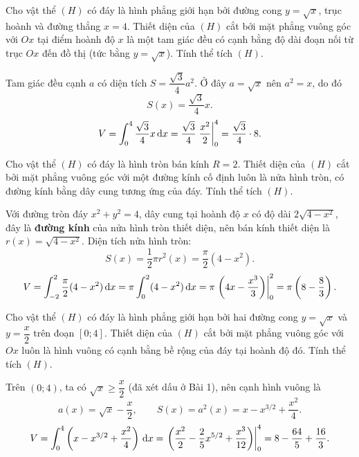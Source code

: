 \begin{hopvidu}
Cho vật thể $(H)$ có đáy là hình phẳng giới hạn bởi đường cong $y=\sqrt{x}$, trục hoành và đường thẳng $x=4$. Thiết diện của $(H)$ cắt bởi mặt phẳng vuông góc với $Ox$ tại điểm hoành độ $x$ là một tam giác đều có cạnh bằng độ dài đoạn nối từ trục $Ox$ đến đồ thị (tức bằng $y=\sqrt{x}$). Tính thể tích $(H)$.
\end{hopvidu}
\begin{loigiai}
Tam giác đều cạnh $a$ có diện tích $S=\dfrac{\sqrt3}{4}a^2$. Ở đây $a=\sqrt{x}$ nên $a^2=x$, do đó
\[
S(x)=\frac{\sqrt3}{4}x.
\]
\[
V=\int_0^4 \frac{\sqrt3}{4}x\,\mathrm{d}x = \frac{\sqrt3}{4}\left.\frac{x^2}{2}\right|_0^4 = \frac{\sqrt3}{4}\cdot8.
\]
\end{loigiai}

\begin{hopvidu}
Cho vật thể $(H)$ có đáy là hình tròn bán kính $R=2$. Thiết diện của $(H)$ cắt bởi mặt phẳng vuông góc với một đường kính cố định luôn là nửa hình tròn, có đường kính bằng dây cung tương ứng của đáy. Tính thể tích $(H)$.
\end{hopvidu}
\begin{loigiai}
Với đường tròn đáy $x^2+y^2=4$, dây cung tại hoành độ $x$ có độ dài $2\sqrt{4-x^2}$, đây là \textbf{đường kính} của nửa hình tròn thiết diện, nên bán kính thiết diện là $r(x)=\sqrt{4-x^2}$. Diện tích nửa hình tròn:
\[
S(x) = \frac12\pi r^2(x) = \frac{\pi}{2}(4-x^2).
\]
\[
V=\int_{-2}^2 \frac{\pi}{2}(4-x^2)\,\mathrm{d}x = \pi\int_0^2(4-x^2)\,\mathrm{d}x = \pi\left.\left(4x-\frac{x^3}{3}\right)\right|_0^2 = \pi\left(8-\frac83\right).
\]
\end{loigiai}

\begin{hopvidu}
Cho vật thể $(H)$ có đáy là hình phẳng giới hạn bởi hai đường cong $y=\sqrt{x}$ và $y=\dfrac{x}{2}$ trên đoạn $[0;4]$. Thiết diện của $(H)$ cắt bởi mặt phẳng vuông góc với $Ox$ luôn là hình vuông có cạnh bằng bề rộng của đáy tại hoành độ đó. Tính thể tích $(H)$.
\end{hopvidu}
\begin{loigiai}
Trên $(0;4)$, ta có $\sqrt{x}\ge \dfrac{x}{2}$ (đã xét dấu ở Bài 1), nên cạnh hình vuông là
\[
a(x)=\sqrt{x}-\frac{x}{2}, \qquad S(x)=a^2(x)=x - x^{3/2}+\frac{x^2}{4}.
\]
\[
V=\int_0^4\left(x-x^{3/2}+\frac{x^2}{4}\right)\,\mathrm{d}x = \left.\left(\frac{x^2}{2}-\frac{2}{5}x^{5/2}+\frac{x^3}{12}\right)\right|_0^4 = 8-\frac{64}{5}+\frac{16}{3}.
\]
\end{loigiai}

